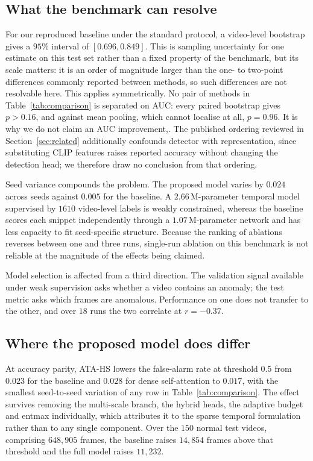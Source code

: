 \documentclass[11pt]{article}
\begin{document}
\subsection{What the benchmark can resolve}

For our reproduced baseline under the standard protocol, a video-level bootstrap
gives a $95\%$ interval of $[0.696, 0.849]$. This is sampling uncertainty for one
estimate on this test set rather than a fixed property of the benchmark, but its
scale matters: it is an order of magnitude larger than the one- to two-point
differences commonly reported between methods, so such differences are not
resolvable here. This applies symmetrically. No pair of methods in Table~\ref{tab:comparison} is
separated on AUC: every paired bootstrap gives $p>0.16$, and against mean pooling,
which cannot localise at all, $p=0.96$. It is why we do not claim an AUC
improvement,. The published ordering reviewed in Section~\ref{sec:related} additionally
confounds detector with representation, since substituting CLIP features raises
reported accuracy without changing the detection head; we therefore draw no
conclusion from that ordering.

Seed variance compounds the problem. The proposed model varies by $0.024$ across
seeds against $0.005$ for the baseline. A $2.66$\,M-parameter temporal model
supervised by $1610$ video-level labels is weakly constrained, whereas the
baseline scores each snippet independently through a $1.07$\,M-parameter network
and has less capacity to fit seed-specific structure. Because the ranking of
ablations reverses between one and three runs, single-run ablation on this
benchmark is not reliable at the magnitude of the effects being claimed.

Model selection is affected from a third direction. The validation signal
available under weak supervision asks whether a video contains an anomaly; the
test metric asks which frames are anomalous. Performance on one does not transfer
to the other, and over $18$ runs the two correlate at $r=-0.37$.

\subsection{Where the proposed model does differ}

At accuracy parity, ATA-HS lowers the false-alarm rate at threshold $0.5$ from
$0.023$ for the baseline and $0.028$ for dense self-attention to $0.017$, with the
smallest seed-to-seed variation of any row in Table~\ref{tab:comparison}. The
effect survives removing the multi-scale branch, the hybrid heads, the adaptive
budget and entmax individually, which attributes it to the sparse temporal
formulation rather than to any single component. Over the $150$ normal test
videos, comprising $648{,}905$ frames, the baseline raises $14{,}854$ frames above
that threshold and the full model raises $11{,}232$.
\end{document}
